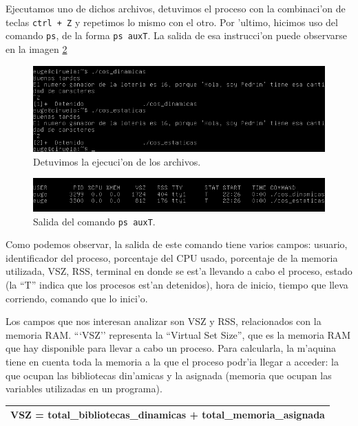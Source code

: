 \documentclass[11pt]{article}
\begin{document}
		Ejecutamos uno de dichos archivos, detuvimos el proceso con la combinaci'on de teclas \texttt{ctrl + Z} y repetimos lo mismo con el otro. Por 'ultimo, hicimos uso del comando \texttt{ps}, de la forma \texttt{ps auxT}. La salida de esa instrucci'on puede observarse en la imagen \ref{fig:ps}

		\begin{figure}[H]
    			\centering
    			\includegraphics[scale=0.65]{Images/Seccion 1/detenidos.png}
    			\caption{Detuvimos la ejecuci'on de los archivos.}
    			\label{fig:detenidos}
		\end{figure}

		\begin{figure}[H]
    			\centering
    			\includegraphics[scale=0.65]{Images/Seccion 1/ps_.png}
    			\caption{Salida del comando \texttt{ps auxT}.}
    			\label{fig:ps}
		\end{figure}

		Como podemos observar, la salida de este comando tiene varios campos: usuario, identificador del proceso, porcentaje del CPU usado, porcentaje de la memoria utilizada, VSZ, RSS, terminal en donde se est'a llevando a cabo el proceso, estado (la ``T'' indica que los procesos est'an detenidos), hora de inicio, tiempo que lleva corriendo, comando que lo inici'o.

		Los campos que nos interesan analizar son VSZ y RSS, relacionados con la memoria RAM. ```VSZ'' representa la ``Virtual Set Size'', que es la memoria RAM que hay disponible para llevar a cabo un proceso. Para calcularla, la m'aquina tiene en cuenta toda la memoria a la que el proceso podr'ia llegar a acceder: la que ocupan las bibliotecas din'amicas y la asignada (memoria que ocupan las variables utilizadas en un programa). %

		\begin{table}[H]
    			\centering
    			\begin{tabular}{|c|}
    			   	\hline VSZ = total\_bibliotecas\_dinamicas + total\_memoria\_asignada \\\hline
		    	\end{tabular}
    			\label{tab:my_label}
		\end{table}
\end{document}
